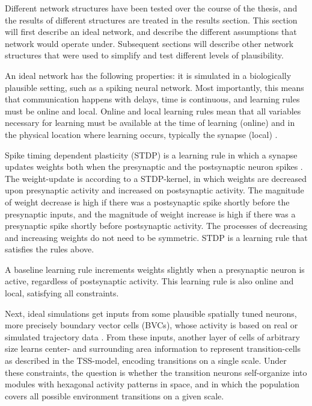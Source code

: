 \documentclass{article}
\begin{document}
    Different network structures have been tested over the course of the thesis, and the results of different structures are treated in the results section. This section will first describe an ideal network, and describe the different assumptions that network would operate under. Subsequent sections will describe other network structures that were used to simplify and test different levels of plausibility.

    An ideal network has the following properties: it is simulated in a biologically plausible setting, such as a spiking neural network. Most importantly, this means that communication happens with delays, time is continuous, and learning rules must be online and local. Online and local learning rules mean that all variables necessary for learning must be available at the time of learning (online) and in the physical location where learning occurs, typically the synapse (local) \parencite{VanDerVeen2022}. 
    
    Spike timing dependent plasticity (STDP) is a learning rule in which a synapse updates weights both when the presynaptic and the postsynaptic neuron spikes \parencite{Song2000}. The weight-update is according to a STDP-kernel, in which weights are decreased upon presynaptic activity and increased on postsynaptic activity. The magnitude of weight decrease is high if there was a postsynaptic spike shortly before the presynaptic inputs, and the magnitude of weight increase is high if there was a presynaptic spike shortly before postsynaptic activity. The processes of decreasing and increasing weights do not need to be symmetric. STDP is a learning rule that satisfies the rules above.

    A baseline learning rule increments weights slightly when a presynaptic neuron is active, regardless of postsynaptic activity. This learning rule is also online and local, satisfying all constraints.
    
    Next, ideal simulations get inputs from some plausible spatially tuned neurons, more precisely boundary vector cells (BVCs), whose activity is based on real or simulated trajectory data \parencite{Lever2009}. From these inputs, another layer of cells of arbitrary size learns center- and surrounding area information to represent transition-cells as described in the TSS-model, encoding transitions on a single scale. Under these constraints, the question is whether the transition neurons self-organize into modules with hexagonal activity patterns in space, and in which the population covers all possible environment transitions on a given scale.
\end{document}
